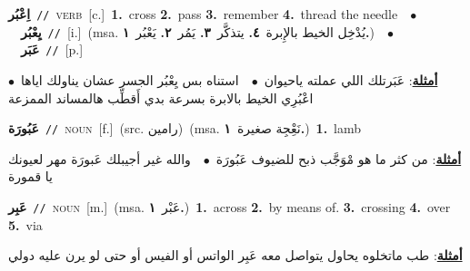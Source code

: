\documentclass[10pt,a4paper,twoside]{article} %
\begin{document}
\begin{multicols}{2}
{{{\setlength\topsep{0pt}\textbf{\foreignlanguage{arabic}{اِعْبُر}}\ {\color{gray}\texttt{//}\color{black}}\ \textsc{verb}\ [c.]\ \textbf{1.}~cross  \textbf{2.}~pass  \textbf{3.}~remember  \textbf{4.}~thread the needle\ \ $\bullet$\ \ \setlength\topsep{0pt}\textbf{\foreignlanguage{arabic}{يِعْبُر}}\ {\color{gray}\texttt{//}\color{black}}\ [i.]\ \color{gray}(msa. \foreignlanguage{arabic}{يُدْخِل الخيط بالإِبرة}~\foreignlanguage{arabic}{\textbf{٤.}}  \foreignlanguage{arabic}{يتذكَّر}~\foreignlanguage{arabic}{\textbf{٣.}}  \foreignlanguage{arabic}{يَمُر}~\foreignlanguage{arabic}{\textbf{٢.}}  \foreignlanguage{arabic}{يَعْبُر}~\foreignlanguage{arabic}{\textbf{١.}})\color{black}\ \ $\bullet$\ \ \setlength\topsep{0pt}\textbf{\foreignlanguage{arabic}{عَبَر}}\ {\color{gray}\texttt{//}\color{black}}\ [p.]\  \begin{flushright}\color{gray}\foreignlanguage{arabic}{\textbf{\underline{\foreignlanguage{arabic}{أمثلة}}}: عَبَرتلك اللي عملته ياحيوان\ $\bullet$\ \  استناه بس يِعْبُر الجسر عشان يناولك اياها\ $\bullet$\ \  اعْبُرِي الخيط بالابرة بسرعة بدي أَقطِّب هالمساند الممزعة}\end{flushright}\color{black}} \vspace{2mm}

{\setlength\topsep{0pt}\textbf{\foreignlanguage{arabic}{عَبُورَة}}\ {\color{gray}\texttt{//}\color{black}}\ \textsc{noun}\ [f.]\ (src. \color{gray}\foreignlanguage{arabic}{رامين}\color{black})\ \color{gray}(msa. \foreignlanguage{arabic}{نَعِْجِة صغيرة}~\foreignlanguage{arabic}{\textbf{١.}})\color{black}\ \textbf{1.}~lamb\  \begin{flushright}\color{gray}\foreignlanguage{arabic}{\textbf{\underline{\foreignlanguage{arabic}{أمثلة}}}: من كثر ما هو مْوَجَّب ذبح للضيوف عَبُورَة\ $\bullet$\ \  والله غير أجيبلك عَبورَة مهر لعيونك يا قمورة}\end{flushright}\color{black}} \vspace{2mm}

{\setlength\topsep{0pt}\textbf{\foreignlanguage{arabic}{عَبِر}}\ {\color{gray}\texttt{//}\color{black}}\ \textsc{noun}\ [m.]\ \color{gray}(msa. \foreignlanguage{arabic}{عَبْر}~\foreignlanguage{arabic}{\textbf{١.}})\color{black}\ \textbf{1.}~across  \textbf{2.}~by means of.  \textbf{3.}~crossing  \textbf{4.}~over  \textbf{5.}~via\  \begin{flushright}\color{gray}\foreignlanguage{arabic}{\textbf{\underline{\foreignlanguage{arabic}{أمثلة}}}: طب ماتخلوه يحاول يتواصل معه عَبِر الواتس أو الفيس أو حتى لو يرن عليه دولي}\end{flushright}\color{black}} \vspace{2mm}

}}
\end{multicols}
\end{document}
